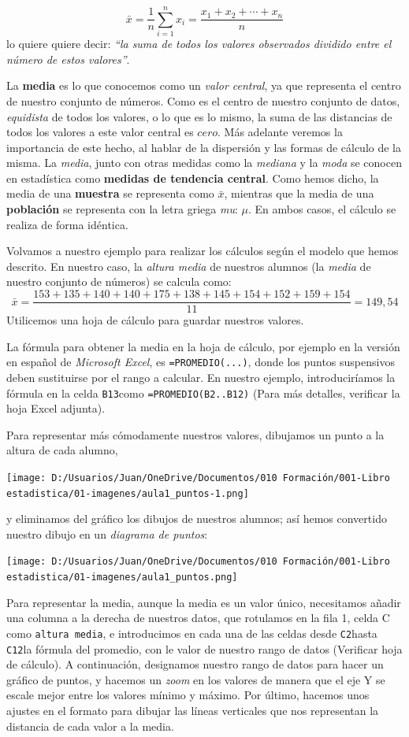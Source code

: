 \documentclass[
  letterpaper,
  DIV=11,
  numbers=noendperiod,
  oneside]{scrreprt}
\begin{document}
\[
{\bar{x}={\frac {1}{n}}\sum _{i=1}^{n}x_{i}={\frac {x_{1}+x_{2}+\cdots +x_{n}}{n}}}
\] lo quiere quiere decir: \emph{``la suma de todos los valores
observados dividido entre el número de estos valores''}.

La \textbf{media} es lo que conocemos como un \emph{valor central}, ya
que representa el centro de nuestro conjunto de números. Como es el
centro de nuestro conjunto de datos, \emph{equidista} de todos los
valores, o lo que es lo mismo, la suma de las distancias de todos los
valores a este valor central es \(cero\). Más adelante veremos la
importancia de este hecho, al hablar de la dispersión y las formas de
cálculo de la misma. La \emph{media}, junto con otras medidas como la
\emph{mediana} y la \emph{moda} se conocen en estadística como
\textbf{medidas de tendencia central}. Como hemos dicho, la media de una
\textbf{muestra} se representa como \(\bar{x}\), mientras que la media
de una \textbf{población} se representa con la letra griega \emph{mu}:
\(\mu\). En ambos casos, el cálculo se realiza de forma idéntica.

Volvamos a nuestro ejemplo para realizar los cálculos según el modelo
que hemos descrito. En nuestro caso, la \emph{altura media} de nuestros
alumnos (la \emph{media} de nuestro conjunto de números) se calcula
como: \[
\bar{x} = \frac{153+135+140+140+175+138+145+154+152+159+154}{11} = 149,54
\] Utilicemos una hoja de cálculo para guardar nuestros valores.

La fórmula para obtener la media en la hoja de cálculo, por ejemplo en
la versión en español de \emph{Microsoft Excel}, es
\texttt{=PROMEDIO(...)}, donde los puntos suspensivos deben sustituirse
por el rango a calcular. En nuestro ejemplo, introduciríamos la fórmula
en la celda \texttt{B13}como \texttt{=PROMEDIO(B2..B12)} (Para más
detalles, verificar la hoja Excel adjunta).

Para representar más cómodamente nuestros valores, dibujamos un punto a
la altura de cada alumno,

\texttt{[image: D:/Usuarios/Juan/OneDrive/Documentos/010 Formación/001-Libro estadistica/01-imagenes/aula1\_puntos-1.png]}

y eliminamos del gráfico los dibujos de nuestros alumnos; así hemos
convertido nuestro dibujo en un \emph{diagrama de puntos}:

\texttt{[image: D:/Usuarios/Juan/OneDrive/Documentos/010 Formación/001-Libro estadistica/01-imagenes/aula1\_puntos.png]}

Para representar la media, aunque la media es un valor único,
necesitamos añadir una columna a la derecha de nuestros datos, que
rotulamos en la fila 1, celda C como \texttt{altura\ media}, e
introducimos en cada una de las celdas desde \texttt{C2}hasta
\texttt{C12}la fórmula del promedio, con le valor de nuestro rango de
datos (Verificar hoja de cálculo). A continuación, designamos nuestro
rango de datos para hacer un gráfico de puntos, y hacemos un \emph{zoom}
en los valores de manera que el eje Y se escale mejor entre los valores
mínimo y máximo. Por último, hacemos unos ajustes en el formato para
dibujar las líneas verticales que nos representan la distancia de cada
valor a la media.
\end{document}
